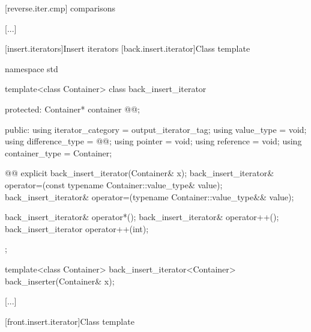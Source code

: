 [reverse.iter.cmp]{ comparisons}

\pnum
{}

[...]


[insert.iterators]{Insert iterators}
[back.insert.iterator]{Class template }


%
\begin{codeblock}
namespace std {
  template<class Container>
  class back_insert_iterator {
  protected:
    Container* container @@;

  public:
    using iterator_category = output_iterator_tag;
    using value_type        = void;
    using difference_type   = @@;
    using pointer           = void;
    using reference         = void;
    using container_type    = Container;

    @@
    explicit back_insert_iterator(Container& x);
    back_insert_iterator& operator=(const typename Container::value_type& value);
    back_insert_iterator& operator=(typename Container::value_type&& value);

    back_insert_iterator& operator*();
    back_insert_iterator& operator++();
    back_insert_iterator  operator++(int);
  };

  template<class Container>
    back_insert_iterator<Container> back_inserter(Container& x);
}
\end{codeblock}

[...]

[front.insert.iterator]{Class template }


